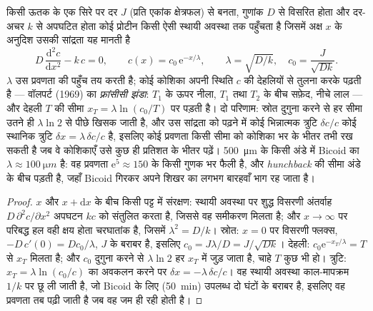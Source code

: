 \begin{theorem}\label{thm:b3:developmental-genetics:gradient}
किसी ऊतक के एक सिरे पर दर $J$ (प्रति एकांक क्षेत्रफल) से बनता,
गुणांक $D$ से विसरित होता और दर-अचर $k$ से अपघटित होता कोई प्रोटीन
किसी ऐसी स्थायी अवस्था तक पहुँचता है जिसमें अक्ष $x$ के अनुदिश उसकी
सांद्रता यह मानती है
\[
D\,\frac{\mathrm{d}^{2}c}{\mathrm{d}x^{2}} - k\,c = 0,
\qquad c(x) = c_{0}\,\mathrm{e}^{-x/\lambda}, \qquad \lambda = \sqrt{D/k},
\quad c_{0} = \frac{J}{\sqrt{Dk}} .
\]
\emph{} $\lambda$ उस प्रवणता की पहुँच तय करती है; कोई कोशिका
अपनी स्थिति $c$ की देहलियों से तुलना करके पढ़ती है --- वॉलपर्ट (1969)
का \emph{फ़्रांसीसी झंडा}: $T_{1}$ के ऊपर नीला, $T_{1}$ तथा
$T_{2}$ के बीच सफ़ेद, नीचे लाल --- और देहली $T$ की सीमा
$x_{T} = \lambda\ln(c_{0}/T)$ पर पड़ती है। दो परिणाम: स्रोत दुगुना करने
से हर सीमा उतने ही $\lambda\ln 2$ से पीछे खिसक जाती है, और उस सांद्रता
को पढ़ने में कोई भिन्नात्मक त्रुटि $\delta c/c$ कोई स्थानिक त्रुटि
$\delta x = \lambda\,\delta c/c$ है, इसलिए कोई प्रवणता किसी सीमा को
कोशिका भर के भीतर तभी रख सकती है जब वे कोशिकाएँ उसे कुछ ही प्रतिशत के
भीतर पढ़ें। \qty{500}{\micro m} के किसी अंडे में Bicoid का
$\lambda \approx \qty{100}{\micro m}$ है: वह प्रवणता
$\mathrm{e}^{5}
\approx 150$ के किसी गुणक भर फैली है, और \emph{hunchback} की सीमा
अंडे के बीच पड़ती है, जहाँ Bicoid गिरकर अपने शिखर का लगभग बारहवाँ भाग रह
जाता है।
\end{theorem}
\begin{proof}
$x$ और $x + \mathrm{d}x$ के बीच किसी पट्ट में संरक्षण: स्थायी अवस्था पर
शुद्ध विसरणी अंतर्वाह $D\,\partial^{2}c/\partial x^{2}$ अपघटन $kc$ को
संतुलित करता है, जिससे वह समीकरण मिलता है; और $x \to \infty$ पर परिबद्ध
हल वही क्षय होता चरघातांक है, जिसमें
$\lambda^{2} = D/k$। स्रोत: $x = 0$ पर विसरणी फ्लक्स, $-D\,
c'(0) = Dc_{0}/\lambda$, $J$ के बराबर है, इसलिए $c_{0} = J\lambda/D =
J/\sqrt{Dk}$। देहली: $c_{0}\mathrm{e}^{-x_{T}/\lambda} = T$ से
$x_{T}$ मिलता है; और $c_{0}$ दुगुना करने से $\lambda\ln 2$ हर
$x_{T}$ में जुड़ जाता है, चाहे $T$ कुछ भी हो। त्रुटि:
$x_{T} = \lambda\ln(c_{0}/c)$ का अवकलन करने पर
$\delta x = -\lambda\,\delta c/c$। वह स्थायी अवस्था काल-मापक्रम
$1/k$ पर छू ली जाती है, जो Bicoid के लिए (\qty{50}{min}) उपलब्ध दो
घंटों के बराबर है, इसलिए वह प्रवणता तब पढ़ी जाती है जब वह जम ही रही होती
है।
\end{proof}

